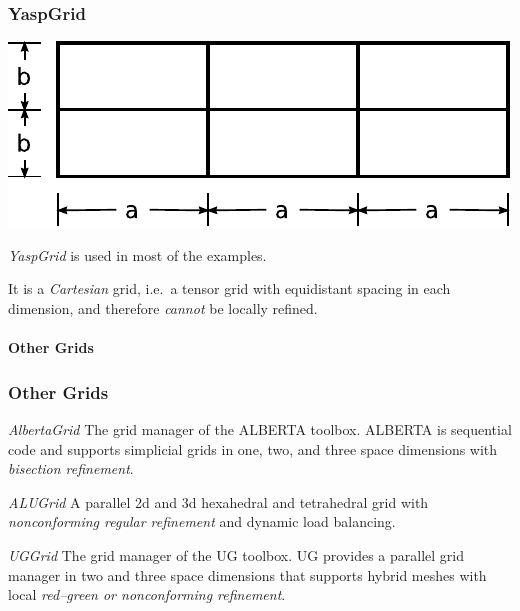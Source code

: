 \begin{frame}
  \frametitle<presentation>{YaspGrid}
  \begin{center}
    \includegraphics{EPS/adaptivity/cartesian}
  \end{center}
  \begin{block}{\emph{YaspGrid}}
    is used in most of the examples.

    It is a \emph{Cartesian} grid, i.e.~a tensor grid with equidistant spacing in each dimension, and therefore \emph{cannot} be locally refined.
  \end{block}
\end{frame}

\paragraph{Other Grids}

\begin{frame}
  \frametitle<presentation>{Other Grids}

  \begin{block}{\emph{AlbertaGrid}}
    The grid manager of the ALBERTA toolbox. 
    ALBERTA is sequential code and supports simplicial grids in one, two, and 
    three space dimensions with \emph{bisection refinement}.

  \end{block}

  \begin{block}{\emph{ALUGrid}}
    A parallel 2d and 3d hexahedral and tetrahedral grid with \emph{nonconforming regular refinement} and dynamic load balancing.

  \end{block}

  \begin{block}{\emph{UGGrid}}
    The grid manager of the UG toolbox.
    UG provides a parallel grid manager in two and three space dimensions 
    that supports hybrid meshes with local \emph{red--green or nonconforming 
    refinement}.


  \end{block}
\end{frame}



